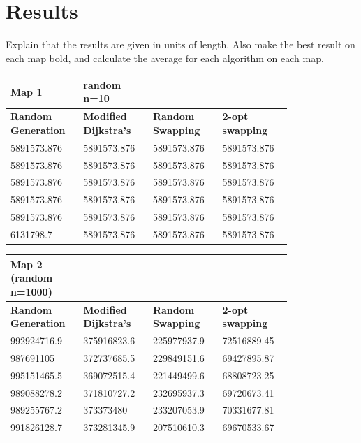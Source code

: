 \documentclass{article}
\begin{document}
\section{Results}\label{Results}

Explain that the results are given in units of length. 
Also make the best result on each map bold, and calculate the average for each algorithm on each map.





\begin{table}[H]
    \centering
    \begin{tabular}{|p{0.2\linewidth}|p{0.2\linewidth}|p{0.2\linewidth}|p{0.2\linewidth}|}
    \hline
        \textbf{Map 1 } & random n=10 & ~ & ~ \\ \hline
        \textbf{Random Generation} & \textbf{Modified Dijkstra's} & \textbf{Random Swapping} & \textbf{2-opt swapping} \\ \hline
        5891573.876 & 5891573.876 & 5891573.876 & 5891573.876 \\ \hline
        5891573.876 & 5891573.876 & 5891573.876 & 5891573.876 \\ \hline
        5891573.876 & 5891573.876 & 5891573.876 & 5891573.876 \\ \hline
        5891573.876 & 5891573.876 & 5891573.876 & 5891573.876 \\ \hline
        5891573.876 & 5891573.876 & 5891573.876 & 5891573.876 \\ \hline
        6131798.7 & 5891573.876 & 5891573.876 & 5891573.876 \\ \hline
    \end{tabular}
\end{table}

\begin{table}[H]
    \centering
    \begin{tabular}{|p{0.2\linewidth}|p{0.2\linewidth}|p{0.2\linewidth}|p{0.2\linewidth}|}
    \hline
        \textbf{Map 2 (random n=1000)} & ~ & ~ & ~ \\ \hline
        \textbf{Random Generation} & \textbf{Modified Dijkstra's} & \textbf{Random Swapping} & \textbf{2-opt swapping} \\ \hline
        992924716.9 & 375916823.6 & 225977937.9 & 72516889.45 \\ \hline
        987691105 & 372737685.5 & 229849151.6 & 69427895.87 \\ \hline
        995151465.5 & 369072515.4 & 221449499.6 & 68808723.25 \\ \hline
        989088278.2 & 371810727.2 & 232695937.3 & 69720673.41 \\ \hline
        989255767.2 & 373373480 & 233207053.9 & 70331677.81 \\ \hline
        991826128.7 & 373281345.9 & 207510610.3 & 69670533.67 \\ \hline
    \end{tabular}
\end{table}
\end{document}

